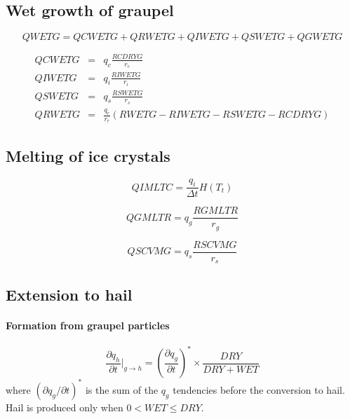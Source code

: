 \begin{enumerate}
\end{enumerate}

\subsection{Wet growth of graupel}

\begin{equation}
  QWETG = QCWETG + QRWETG + QIWETG + QSWETG + QGWETG
\end{equation}

\begin{eqnarray}
  QCWETG & = & q_c \frac{RCDRYG}{r_c} \\
  QIWETG & = & q_i \frac{RIWETG}{r_i} \\
  QSWETG & = & q_s \frac{RSWETG}{r_s} \\
  QRWETG & = & \frac{q_r}{r_r} (RWETG - RIWETG - RSWETG - RCDRYG)
\end{eqnarray} 

\subsection{Melting of ice crystals}

\begin{equation}
  QIMLTC = \frac{q_i}{\Delta t} H(T_t)
\end{equation} 

\begin{equation}
  QGMLTR = q_g \frac{RGMLTR}{r_g}
\end{equation}

\begin{equation}
  QSCVMG = q_s \frac{RSCVMG}{r_s}
\end{equation}

\subsection{Extension to hail}

\paragraph{Formation from graupel particles}

\begin{equation}
  \frac{\partial q_h}{\partial t} \bigg| _{g \rightarrow h} = \left( \frac{\partial q_g}{\partial t}\right) ^\ast \times \frac{DRY}{DRY+WET} 
\end{equation}
where $(\partial q_g / \partial t)^\ast$ is the sum of the $q_g$ tendencies before the conversion to hail.
Hail is produced only when $0 < WET \leq DRY$.


